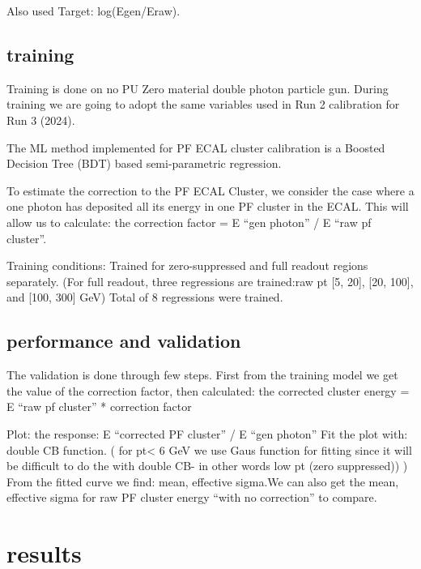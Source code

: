 Also  used Target: log(Egen/Eraw).

\subsection{training}
Training is done on no PU Zero material double photon particle gun. During training we are going to adopt the same variables used in Run 2 calibration for Run 3 (2024).

The ML method implemented for PF ECAL cluster calibration is a Boosted Decision Tree (BDT) based semi-parametric regression.

To estimate the correction to  the PF ECAL Cluster, we consider the case where a one photon has deposited all its energy in one PF cluster in the ECAL.
This will allow us to calculate: the correction factor = E “gen photon” / E “raw pf cluster”.


Training conditions:
Trained for zero-suppressed and full readout regions separately.
(For full readout, three regressions are trained:raw pt [5, 20], [20, 100], and [100, 300] GeV)
Total of 8 regressions were trained.

\subsection{performance and validation}
The validation is done through few steps.
First from the training model we get the value of the correction factor, then  calculated:  the corrected cluster energy = E “raw pf cluster” * correction factor

Plot: the response: E “corrected PF cluster” / E “gen photon”
Fit the plot with: double CB function. ( for pt< 6 GeV we use Gaus function for fitting since it will be difficult to do the with double CB- in other words low pt (zero suppressed)) ) 
From the fitted curve we find: mean, effective sigma.We can also get the mean, effective sigma for raw PF cluster energy “with no correction” to compare.

\section{results}


